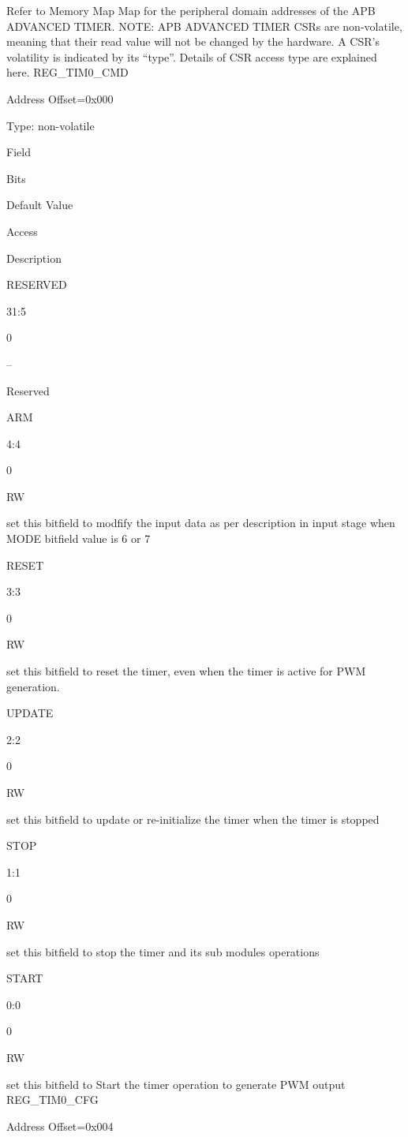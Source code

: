 Refer to Memory Map Map for the peripheral domain addresses of the APB ADVANCED TIMER. NOTE: APB ADVANCED TIMER CSRs are non-volatile, meaning that their read value will not be changed by the hardware. A CSR’s volatility is indicated by its “type”. Details of CSR access type are explained here.
REG_TIM0_CMD

    Address Offset=0x000

    Type: non-volatile

Field
	

Bits
	

Default Value
	

Access
	

Description

RESERVED
	

31:5
	

0
	

–
	

Reserved

ARM
	

4:4
	

0
	

RW
	

set this bitfield to modfify the input data as per description in input stage when MODE bitfield value is 6 or 7

RESET
	

3:3
	

0
	

RW
	

set this bitfield to reset the timer, even when the timer is active for PWM generation.

UPDATE
	

2:2
	

0
	

RW
	

set this bitfield to update or re-initialize the timer when the timer is stopped

STOP
	

1:1
	

0
	

RW
	

set this bitfield to stop the timer and its sub modules operations

START
	

0:0
	

0
	

RW
	

set this bitfield to Start the timer operation to generate PWM output
REG_TIM0_CFG

    Address Offset=0x004

